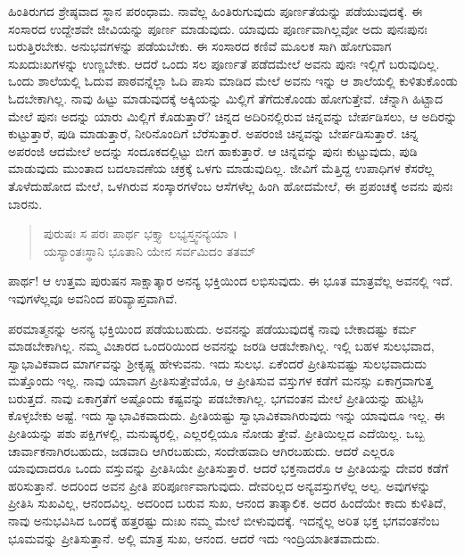 ಹಿಂತಿರುಗದ ಶ್ರೇಷ್ಠವಾದ ಸ್ಥಾನ ಪರಂಧಾಮ. ನಾವೆಲ್ಲ ಹಿಂತಿರುಗುವುದು ಪೂರ್ಣತೆಯನ್ನು ಪಡೆಯುವುದಕ್ಕೆ. ಈ ಸಂಸಾರದ ಉದ್ದೇಶವೇ ಜೀವಿಯನ್ನು ಪೂರ್ಣ ಮಾಡುವುದು. ಯಾವುದು ಪೂರ್ಣವಾಗಿಲ್ಲವೋ ಅದು ಪುನಃಪುನಃ ಬರುತ್ತಿರಬೇಕು. ಅನುಭವಗಳನ್ನು ಪಡೆಯಬೇಕು. ಈ ಸಂಸಾರದ ಕಣಿವೆ ಮೂಲಕ ಸಾಗಿ ಹೋಗುವಾಗ ಸುಖದುಃಖಗಳನ್ನು ಉಣ್ಣಬೇಕು. ಆದರೆ ಒಂದು ಸಲ ಪೂರ್ಣತೆ ಪಡೆದಮೇಲೆ ಅವನು ಪುನಃ ಇಲ್ಲಿಗೆ ಬರುವುದಿಲ್ಲ. ಒಂದು ಶಾಲೆಯಲ್ಲಿ ಓದುವ ಪಾಠವನ್ನೆಲ್ಲಾ ಓದಿ ಪಾಸು ಮಾಡಿದ ಮೇಲೆ ಅವನು ಇನ್ನು ಆ ಶಾಲೆಯಲ್ಲಿ ಕುಳಿತುಕೊಂಡು ಓದಬೇಕಾಗಿಲ್ಲ. ನಾವು ಹಿಟ್ಟು ಮಾಡುವುದಕ್ಕೆ ಅಕ್ಕಿಯನ್ನು ಮಿಲ್ಲಿಗೆ ತೆಗೆದುಕೊಂಡು ಹೋಗುತ್ತೇವೆ. ಚೆನ್ನಾಗಿ ಹಿಟ್ಟಾದ ಮೇಲೆ ಪುನಃ ಅದನ್ನು ಯಾರು ಮಿಲ್ಲಿಗೆ ಕೊಡುತ್ತಾರೆ? ಚಿನ್ನದ ಅದಿರಿನಲ್ಲಿರುವ ಚಿನ್ನವನ್ನು ಬೇರ್ಪಡಿಸಲು, ಆ ಅದಿರನ್ನು ಕುಟ್ಟುತ್ತಾರೆ, ಪುಡಿ ಮಾಡುತ್ತಾರೆ, ನೀರಿನೊಂದಿಗೆ ಬೆರೆಸುತ್ತಾರೆ. ಅಪರಂಜಿ ಚಿನ್ನವನ್ನು ಬೇರ್ಪಡಿಸುತ್ತಾರೆ. ಚಿನ್ನ ಅಪರಂಜಿ ಆದಮೇಲೆ ಅದನ್ನು ಸಂದೂಕದಲ್ಲಿಟ್ಟು ಬೀಗ ಹಾಕುತ್ತಾರೆ. ಆ ಚಿನ್ನವನ್ನು ಪುನಃ ಕುಟ್ಟುವುದು, ಪುಡಿ ಮಾಡುವುದು ಮುಂತಾದ ಬದಲಾವಣೆಯ ಚಕ್ರಕ್ಕೆ ಒಳಗು ಮಾಡುವುದಿಲ್ಲ. ಜೀವಿಗೆ ಮೆತ್ತಿದ್ದ ಉಪಾಧಿಗಳ ಕೆಸರೆಲ್ಲ ತೊಳೆದುಹೋದ ಮೇಲೆ, ಒಳಗಿರುವ ಸಂಸ್ಕಾರಗಳೆಂಬ ಆಸೆಗಳೆಲ್ಲ ಹಿಂಗಿ ಹೋದಮೇಲೆ, ಈ ಪ್ರಪಂಚಕ್ಕೆ ಅವನು ಪುನಃ ಬಾರನು.

\begin{verse}
ಪುರುಷಃ ಸ ಪರಃ ಪಾರ್ಥ ಭಕ್ತ್ಯಾ ಲಭ್ಯಸ್ತ್ವನನ್ಯಯಾ ।\\ಯಸ್ಯಾಂತಃಸ್ಥಾನಿ ಭೂತಾನಿ ಯೇನ ಸರ್ವಮಿದಂ ತತಮ್ 
\end{verse}

{\small ಪಾರ್ಥ! ಆ ಉತ್ತಮ ಪುರುಷನ ಸಾಕ್ಷಾತ್ಕಾರ ಅನನ್ಯ ಭಕ್ತಿಯಿಂದ ಲಭಿಸುವುದು. ಈ ಭೂತ ಮಾತ್ರವೆಲ್ಲ ಅವನಲ್ಲಿ ಇದೆ. ಇವುಗಳೆಲ್ಲವೂ ಅವನಿಂದ ಪರಿವ್ಯಾಪ್ತವಾಗಿವೆ.}

ಪರಮಾತ್ಮನನ್ನು ಅನನ್ಯ ಭಕ್ತಿಯಿಂದ ಪಡೆಯಬಹುದು. ಅವನನ್ನು ಪಡೆಯುವುದಕ್ಕೆ ನಾವು ಬೇಕಾದಷ್ಟು ಕರ್ಮ ಮಾಡಬೇಕಾಗಿಲ್ಲ. ನಮ್ಮ ವಿಚಾರದ ಒಂದರಿಯಿಂದ ಅವನನ್ನು ಜರಡಿ ಆಡಬೇಕಾಗಿಲ್ಲ. ಇಲ್ಲಿ ಬಹಳ ಸುಲಭವಾದ, ಸ್ವಾಭಾವಿಕವಾದ ಮಾರ್ಗವನ್ನು ಶ್ರೀಕೃಷ್ಣ ಹೇಳುವನು. ಇದು ಸುಲಭ. ಏಕೆಂದರೆ ಪ್ರೀತಿಸುವಷ್ಟು ಸುಲಭವಾದುದು ಮತ್ತೊಂದು ಇಲ್ಲ. ನಾವು ಯಾವಾಗ ಪ್ರೀತಿಸುತ್ತೇವೆಯೊ, ಆ ಪ್ರೀತಿಸುವ ವಸ್ತುಗಳ ಕಡೆಗೆ ಮನಸ್ಸು ಏಕಾಗ್ರವಾಗುತ್ತ ಬರುತ್ತದೆ. ನಾವು ಏಕಾಗ್ರತೆಗೆ ಅಷ್ಟೊಂದು ಕಷ್ಟವನ್ನು ಪಡಬೇಕಾಗಿಲ್ಲ. ಭಗವಂತನ ಮೇಲೆ ಪ್ರೀತಿಯನ್ನು ಹುಟ್ಟಿಸಿ ಕೊಳ್ಳಬೇಕು ಅಷ್ಟೆ. ಇದು ಸ್ವಾಭಾವಿಕವಾದುದು. ಪ್ರೀತಿಯಷ್ಟು ಸ್ವಾಭಾವಿಕವಾಗಿರುವುದು ಇನ್ನು ಯಾವುದೂ ಇಲ್ಲ. ಈ ಪ್ರೀತಿಯನ್ನು ಪಶು ಪಕ್ಷಿಗಳಲ್ಲಿ, ಮನುಷ್ಯರಲ್ಲಿ, ಎಲ್ಲರಲ್ಲಿಯೂ ನೋಡು ತ್ತೇವೆ. ಪ್ರೀತಿಯಿಲ್ಲದ ಎದೆಯಿಲ್ಲ. ಒಬ್ಬ ಚಾರ್ವಾಕನಾಗಿರಬಹುದು, ಜಡವಾದಿ ಆಗಿರಬಹುದು, ಸಂದೇಹವಾದಿ ಆಗಿರಬಹುದು. ಆದರೆ ಎಲ್ಲರೂ ಯಾವುದಾದರೂ ಒಂದು ವಸ್ತುವನ್ನು ಪ್ರೀತಿಸಿಯೇ ಪ್ರೀತಿಸುತ್ತಾರೆ. ಆದರೆ ಭಕ್ತನಾದರೊ ಆ ಪ್ರೀತಿಯನ್ನು ದೇವರ ಕಡೆಗೆ ಹರಿಸುತ್ತಾನೆ. ಅದರಿಂದ ಅವನ ಪ್ರೀತಿ ಪರಿಪೂರ್ಣವಾಗುವುದು. ದೇವರಿಲ್ಲದ ಅನ್ಯವಸ್ತುಗಳೆಲ್ಲ ಅಲ್ಪ. ಅವುಗಳನ್ನು ಪ್ರೀತಿಸಿ ಸುಖವಿಲ್ಲ, ಆನಂದವಿಲ್ಲ. ಅದರಿಂದ ಬರುವ ಸುಖ, ಆನಂದ ತಾತ್ಕಾಲಿಕ. ಅದರ ಹಿಂದೆಯೇ ಕಾದು ಕುಳಿತಿದೆ, ನಾವು ಅನುಭವಿಸಿದ ಒಂದಕ್ಕೆ ಹತ್ತರಷ್ಟು ದುಃಖ ನಮ್ಮ ಮೇಲೆ ಬೀಳುವುದಕ್ಕೆ. ಇದನ್ನೆಲ್ಲ ಅರಿತ ಭಕ್ತ ಭಗವಂತನೆಂಬ ಭೂಮವನ್ನು ಪ್ರೀತಿಸುತ್ತಾನೆ. ಅಲ್ಲಿ ಮಾತ್ರ ಸುಖ, ಆನಂದ. ಆದರೆ ಇದು ಇಂದ್ರಿಯಾತೀತವಾದುದು.

